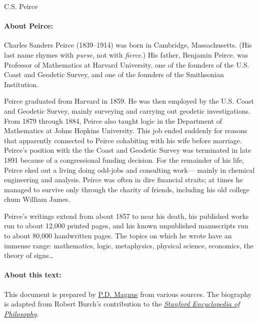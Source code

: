 \documentclass[]{article}
\newcommand*{\authortitle}[1]{\centerline{\Huge\sc #1}}
\begin{document}
\authortitle{C.S. Peirce}

\bigskip


\paragraph{About Peirce:}
Charles Sanders Peirce (1839--1914) was born in Cambridge,
Massachusetts. (His last name rhymes with \emph{purse}, not with \emph{fierce}.) His father, Benjamin Peirce. was Professor of Mathematics at
Harvard University, one of the founders of the U.S. Coast and
Geodetic Survey, and one of the founders of the Smithsonian
Institution.

Peirce graduated from Harvard in 1859. He was then
employed by the U.S. Coast and Geodetic Survey, mainly surveying and
carrying out geodetic investigations. From 1879 through 1884, Peirce
also taught logic in the Department of Mathematics at Johns Hopkins University. This job ended suddenly for reasons that
apparently connected to Peirce cohabiting with his wife before marriage. Peirce's position with the the Coast and Geodetic Survey was
terminated in late 1891 because of a congressional funding decision. For the remainder of his life, Peirce eked out a living doing odd-jobs and consulting work--- mainly in chemical engineering and analysis. Peirce was often in dire financial straits; at times he managed to survive only through the charity of friends, including his old college chum William James.

Peirce's writings extend from about 1857 to near his
death, his published works run to about 12,000 printed pages, and his known unpublished manuscripts run to about 80,000 handwritten pages. The topics on which he wrote have an immense range: mathematics, logic, metaphysics, physical science, economics, the theory of signs\ldots

\paragraph{About this text:}
This document is prepared by \href{https://www.fecundity.com}{P.D. Magnus} from various sources. The biography is adapted from Robert Burch's contribution to the \href{http://plato.stanford.edu}{\emph{Stanford Encyclopedia of Philosophy}}.





\end{document}
